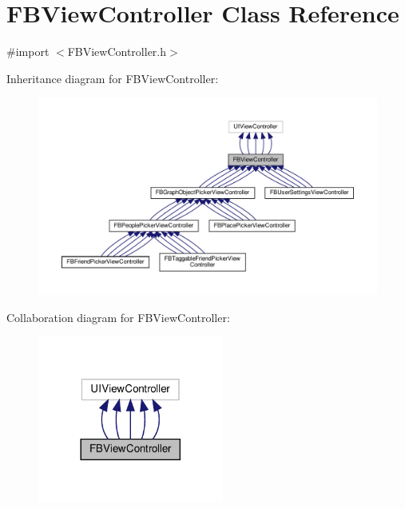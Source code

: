 \hypertarget{interfaceFBViewController}{}\section{F\+B\+View\+Controller Class Reference}
\label{interfaceFBViewController}


{\ttfamily \#import $<$F\+B\+View\+Controller.\+h$>$}



Inheritance diagram for F\+B\+View\+Controller\+:
\nopagebreak
\begin{figure}[H]
\begin{center}
\leavevmode
\includegraphics[width=350pt]{interfaceFBViewController__inherit__graph}
\end{center}
\end{figure}


Collaboration diagram for F\+B\+View\+Controller\+:
\nopagebreak
\begin{figure}[H]
\begin{center}
\leavevmode
\includegraphics[width=173pt]{interfaceFBViewController__coll__graph}
\end{center}
\end{figure}
